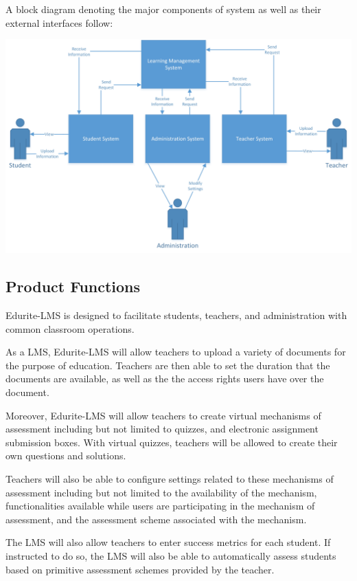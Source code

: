 \documentclass[]{article}
\begin{document}
A block diagram denoting the major components of system as well as their
external interfaces follow:

\begin{center}
\includegraphics[scale=0.7]{A1_Assets/2-1_Product_Perspective_Diagram.jpg}
\end{center}


\subsection{Product Functions}
\label{sub:product_functions}
Edurite-LMS is designed to facilitate students, teachers, and administration
with common classroom operations.

As a LMS, Edurite-LMS will allow teachers to upload a variety of documents for
the purpose of education. Teachers are then able to set the duration that the
documents are available, as well as the the access rights users have over the
document.

Moreover, Edurite-LMS will allow teachers to create virtual mechanisms of
assessment including but not limited to quizzes, and electronic assignment
submission boxes. With virtual quizzes, teachers will be allowed to create their
own questions and solutions.

Teachers will also be able to configure settings related to these mechanisms of
assessment including but not limited to the availability of the mechanism,
functionalities available while users are participating in the mechanism of
assessment, and the assessment scheme associated with the mechanism.

The LMS will also allow teachers to enter success metrics for each student. If
instructed to do so, the LMS will also be able to automatically assess students
based on primitive assessment schemes provided by the teacher.
\end{document}
